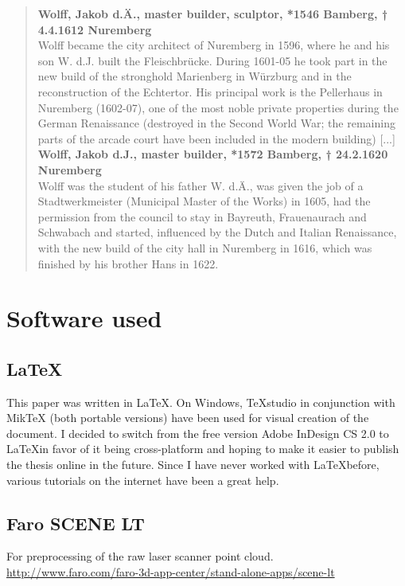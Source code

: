 \blockquote{
	
	\textbf{Wolff, Jakob d.Ä., master builder, sculptor, *1546 Bamberg, † 4.4.1612 Nuremberg} \\
	Wolff became the city architect of Nuremberg in 1596, where he and his son W. d.J. built the Fleischbrücke. During 1601-05 he took part in the new build of the stronghold Marienberg in Würzburg and in the reconstruction of the Echtertor. His principal work is the Pellerhaus in Nuremberg (1602-07), one of the most noble private properties during the German Renaissance (destroyed in the Second World War; the remaining parts of the arcade court have been included in the modern building) [...] \\
	
	\textbf{Wolff, Jakob d.J., master builder, *1572 Bamberg, † 24.2.1620 Nuremberg} \\
	Wolff was the student of his father W. d.Ä., was given the job of a Stadtwerkmeister (Municipal Master of the Works) in 1605, had the permission from the council to stay in Bayreuth, Frauenaurach and Schwabach and started, influenced by the Dutch and Italian Renaissance, with the new build of the city hall in Nuremberg in 1616, which was finished by his brother Hans in 1622. \\
	
}





\section{Software used}

\subsection{\LaTeX}
This paper was written in \LaTeX. On Windows, TeXstudio in conjunction with MikTeX (both portable versions) have been used for visual creation of the document. I decided to switch from the free version Adobe InDesign CS 2.0 to \LaTeX in favor of it being cross-platform and hoping to make it easier to publish the thesis online in the future. Since I have never worked with \LaTeX before, various tutorials \parencite{ytLaTeX,webLaTeX-Tutorial} on the internet have been a great help.

\subsection{Faro SCENE LT}
For preprocessing of the raw laser scanner point cloud. \url{http://www.faro.com/faro-3d-app-center/stand-alone-apps/scene-lt}

